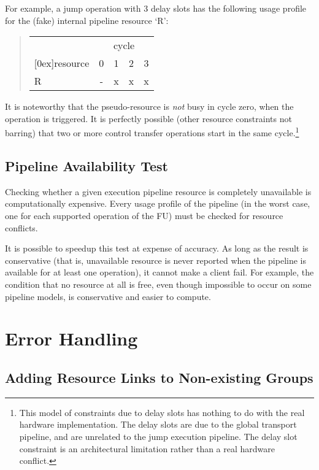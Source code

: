 \documentclass[a4paper,twoside]{tce}
\begin{document}
For example, a jump operation with 3 delay slots has the following usage
profile for the (fake) internal pipeline resource `R':
\begin{quote}
\begin{tabular}{|l|c|c|c|c|}
\hline
                & \multicolumn{4}{c|}{cycle} \\
\cline{2-5}
  \raisebox{1.5ex}[0ex]{resource} & 0  & 1 & 2  & 3 \\
\hline
  R                               &  - & x & x & x \\
\hline
\end{tabular}
\end{quote}
It is noteworthy that the pseudo-resource is \emph{not} busy in cycle zero,
when the operation is triggered. It is perfectly possible (other resource
constraints not barring) that two or more control transfer operations start
in the same cycle.\footnote{
%
  This model of constraints due to delay slots has nothing to do with the
  real hardware implementation. The delay slots are due to the global
  transport pipeline, and are unrelated to the jump execution pipeline. The
  delay slot constraint is an architectural limitation rather than a real
  hardware conflict.}

\subsection{Pipeline Availability Test}
\label{ssec:pipeline-available-test}

Checking whether a given execution pipeline resource is completely
unavailable is computationally expensive. Every usage profile of the
pipeline (in the worst case, one for each supported operation of the FU)
must be checked for resource conflicts.

It is possible to speedup this test at expense of accuracy. As long as the
result is conservative (that is, unavailable resource is never reported when
the pipeline is available for at least one operation), it cannot make a
client fail.
%
For example, the condition that no resource at all is free, even though
impossible to occur on some pipeline models, is conservative and easier to
compute.

\section{Error Handling}
\label{ssec:resource-model-errors}

\subsection{Adding Resource Links to Non-existing Groups}
\end{document}
